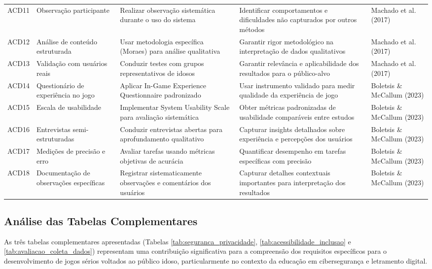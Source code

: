 \begin{table}[H]
\begin{table}[H]
\begin{tabular}{p{0.5cm}p{3cm}p{4cm}p{4cm}p{2.5cm}}
ACD11 & Observação participante & Realizar observação sistemática durante o uso do sistema & Identificar comportamentos e dificuldades não capturados por outros métodos & Machado et al. (2017) \\
ACD12 & Análise de conteúdo estruturada & Usar metodologia específica (Moraes) para análise qualitativa & Garantir rigor metodológico na interpretação de dados qualitativos & Machado et al. (2017) \\
ACD13 & Validação com usuários reais & Conduzir testes com grupos representativos de idosos & Garantir relevância e aplicabilidade dos resultados para o público-alvo & Machado et al. (2017) \\
ACD14 & Questionário de experiência no jogo & Aplicar In-Game Experience Questionnaire padronizado & Usar instrumento validado para medir qualidade da experiência de jogo & Boletsis \& McCallum (2023) \\
ACD15 & Escala de usabilidade & Implementar System Usability Scale para avaliação sistemática & Obter métricas padronizadas de usabilidade comparáveis entre estudos & Boletsis \& McCallum (2023) \\
ACD16 & Entrevistas semi-estruturadas & Conduzir entrevistas abertas para aprofundamento qualitativo & Capturar insights detalhados sobre experiência e percepções dos usuários & Boletsis \& McCallum (2023) \\
ACD17 & Medições de precisão e erro & Avaliar tarefas usando métricas objetivas de acurácia & Quantificar desempenho em tarefas específicas com precisão & Boletsis \& McCallum (2023) \\
ACD18 & Documentação de observações específicas & Registrar sistematicamente observações e comentários dos usuários & Capturar detalhes contextuais importantes para interpretação dos resultados & Boletsis \& McCallum (2023) \\
\hline
\end{tabular}
\end{table}


\subsection{Análise das Tabelas Complementares}
\label{subsec:analise_tabelas_complementares}

As três tabelas complementares apresentadas (Tabelas \ref{tab:seguranca_privacidade}, \ref{tab:acessibilidade_inclusao} e \ref{tab:avaliacao_coleta_dados}) representam uma contribuição significativa para a compreensão dos requisitos específicos para o desenvolvimento de jogos sérios voltados ao público idoso, particularmente no contexto da educação em cibersegurança e letramento digital.


\end{table}
